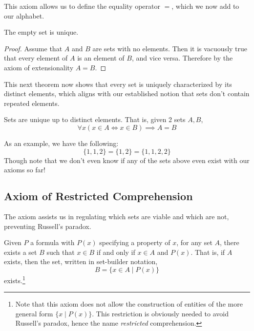   \begin{definition}[Equality]
    This axiom allows us to define the equality operator $=$, which we now add to our alphabet. 
  \end{definition} 

  \begin{theorem}
    The empty set is unique. 
  \end{theorem}
  \begin{proof}
    Assume that $A$ and $B$ are sets with no elements. Then it is vacuously true that every element of $A$ is an element of $B$, and vice versa. Therefore by the axiom of extensionality $A = B$. 
  \end{proof}

  This next theorem now shows that every set is uniquely characterized by its distinct elements, which aligns with our established notion that sets don't contain repeated elements. 

  \begin{theorem}
    Sets are unique up to distinct elements. That is, given 2 sets $A, B$, 
    \begin{equation}
      \forall x (x \in A \iff x \in B) \implies A = B
    \end{equation}
  \end{theorem} 

  As an example, we have the following: 
  \begin{equation}
    \{1, 1, 2\} = \{1, 2\} = \{1, 1, 2, 2\}
  \end{equation} 
  Though note that we don't even know if any of the sets above even exist with our axioms so far! 

\subsection{Axiom of Restricted Comprehension}

  The axiom assists us in regulating which sets are viable and which are not, preventing Russell's paradox. 

  \begin{axiom}
    Given $P$ a formula with $P(x)$ specifying a property of $x$, for any set $A$, there exists a set $B$ such that $x \in B$ if and only if $x \in A$ and $P(x)$. That is, if $A$ exists, then the set, written in set-builder notation, 
    \begin{equation}
      B = \{x \in A \mid P(x) \}
    \end{equation}
    exists.\footnote{Note that this axiom does not allow the construction of entities of the more general form $\{x \mid P(x)\}$. This restriction is obviously needed to avoid Russell's paradox, hence the name \textit{restricted} comprehension. } 
  \end{axiom} 

